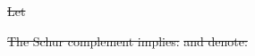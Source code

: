 \documentclass[ba]{imsart}
\newcommand{\M}{\mathcal{M}}
\newcommand{\obs}{\mathcal{O}}
\newcommand{\fwd}{\mathcal{F}}
\newcommand{\obsm}{\widehat{\obs}}
\newcommand{\Sigmam}{\widehat{\Sigma}}
\newcommand{\meas}{\mathbf{o}}
\theoremstyle{plain}
\theoremstyle{definition}
\theoremstyle{remark}
\providecommand{\DIFdeltex}[1]{{\protect\color{red}\sout{#1}}}                      %
\providecommand{\DIFdelbegin}{} %
\providecommand{\DIFdel}[1]{\texorpdfstring{\DIFdeltex{#1}}{}} %
\newcommand{\DIFscaledelfig}{0.5}
\newlength{\DIFdelgraphicswidth} %
\newlength{\DIFdelgraphicsheight} %
\newcommand{\DIFdelincludegraphics}[2][]{%
\sbox{\DIFdelgraphicsbox}{\DIFOincludegraphics[#1]{#2}}%
\settoboxwidth{\DIFdelgraphicswidth}{\DIFdelgraphicsbox} %
\settoboxtotalheight{\DIFdelgraphicsheight}{\DIFdelgraphicsbox} %
\scalebox{\DIFscaledelfig}{%
\parbox[b]{\DIFdelgraphicswidth}{\usebox{\DIFdelgraphicsbox}\\[-\baselineskip] \rule{\DIFdelgraphicswidth}{0em}}\llap{\resizebox{\DIFdelgraphicswidth}{\DIFdelgraphicsheight}{%
\setlength{\unitlength}{\DIFdelgraphicswidth}%
\begin{picture}(1,1)%
\thicklines\linethickness{2pt} %
{\color[rgb]{1,0,0}\put(0,0){\framebox(1,1){}}}%
{\color[rgb]{1,0,0}\put(0,0){\line( 1,1){1}}}%
{\color[rgb]{1,0,0}\put(0,1){\line(1,-1){1}}}%
\end{picture}%
}\hspace*{3pt}}} %
} %
\DeclareRobustCommand{\DIFdelbegin}{\DIFOdelbegin \let\includegraphics\DIFdelincludegraphics} %
\begin{document}
\DIFdelbegin %
\DIFdel{Let
  }%

\DIFdel{The Schur complement implies:
  }%
  \DIFdel{and denote:
  }%
\end{document}
